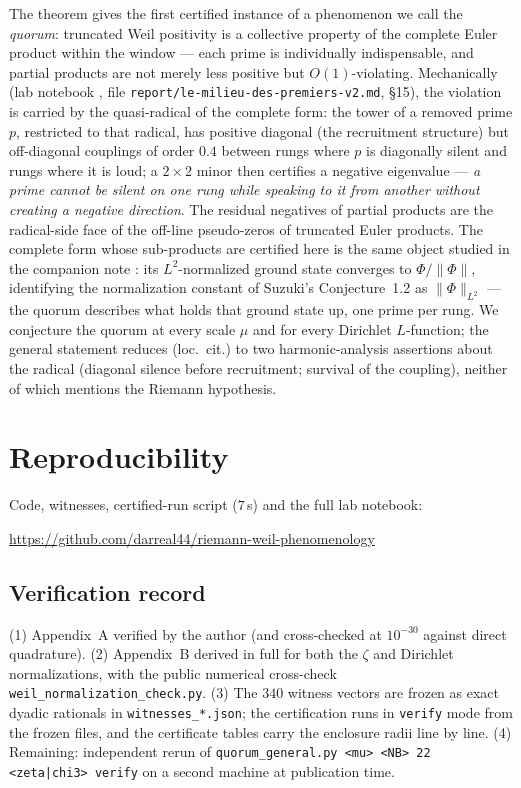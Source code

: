 \documentclass[10pt]{article}
\begin{document}
The theorem gives the first certified instance of a phenomenon we call the
\emph{quorum}: truncated Weil positivity is a collective property of the
complete Euler product within the window --- each prime is individually
indispensable, and partial products are not merely less positive but
$O(1)$-violating. Mechanically (lab notebook \cite{LabNB},
file \texttt{report/le-milieu-des-premiers-v2.md}, \S15), the
violation is carried by the quasi-radical of the complete form: the tower
of a removed prime $p$, restricted to that radical, has positive diagonal
(the recruitment structure) but off-diagonal couplings of order $0.4$
between rungs where $p$ is diagonally silent and rungs where it is loud;
a $2\times2$ minor then certifies a negative eigenvalue --- \emph{a prime
cannot be silent on one rung while speaking to it from another without
creating a negative direction}. The residual negatives of partial products
are the radical-side face of the off-line pseudo-zeros of truncated Euler
products. The complete form whose sub-products are certified here is the same
object studied in the companion note \cite{Snote}: its $L^2$-normalized
ground state converges to $\Phi/\lVert\Phi\rVert$, identifying the
normalization constant of Suzuki's Conjecture~1.2 \cite{S26} as
$\lVert\Phi\rVert_{L^2}$ --- the quorum describes what holds that
ground state up, one prime per rung. We conjecture the quorum at every
scale $\mu$ and for every Dirichlet $L$-function; the general statement reduces (loc.\ cit.) to two
harmonic-analysis assertions about the radical (diagonal silence before
recruitment; survival of the coupling), neither of which mentions the
Riemann hypothesis.

\section*{Reproducibility}

Code, witnesses, certified-run script ($7$\,s) and the full lab notebook:
\begin{center}
\url{https://github.com/darreal44/riemann-weil-phenomenology}
\end{center}

\subsection*{Verification record}
(1) Appendix~A verified by the author (and cross-checked at $10^{-30}$
against direct quadrature). (2) Appendix~B derived in full for both the
$\zeta$ and Dirichlet normalizations, with the public numerical
cross-check \texttt{weil\_normalization\_check.py}. (3) The $340$
witness vectors are frozen as exact dyadic rationals in
\texttt{witnesses\_*.json}; the certification runs in \texttt{verify}
mode from the frozen files, and the certificate tables carry the
enclosure radii line by line. (4) Remaining: independent rerun of
\texttt{quorum\_general.py <mu> <NB> 22 <zeta|chi3> verify} on a second
machine at publication time.
\end{document}
